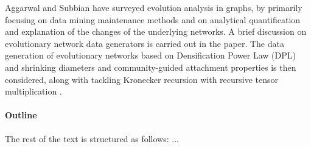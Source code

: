 
Aggarwal and Subbian \cite{AggarwalS14} have surveyed evolution analysis in
graphs, by primarily focusing on data mining maintenance methods and on analytical
quantification and explanation of the changes of the underlying networks.
A brief discussion on evolutionary
network data generators is carried out in
the paper. The data generation of evolutionary networks based on
Densification Power Law (DPL) and shrinking diameters \cite{LeskovecKF05} and community-guided
attachment properties \cite{LeskovecKF05} is then considered, along with tackling Kronecker
recursion with recursive tensor multiplication \cite{AkogluMF08}.




\paragraph*{Outline} The rest of the text is structured as follows: ...


